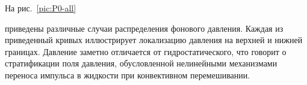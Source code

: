 



%











%









На рис.~\ref{pic:P0-all} %

приведены различные случаи распределения фонового давления. Каждая из приведенный кривых иллюстрирует локализацию давления на верхней и нижней границах. Давление заметно отличается от гидростатического, что говорит о стратификации поля давления, обусловленной нелинейными механизмами переноса импульса в жидкости при конвективном перемешивании.



